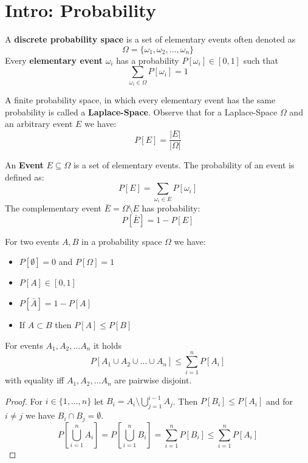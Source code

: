 \section{Intro: Probability}

\begin{definition}
    A \textbf{discrete probability space} is a set of elementary events often denoted as 
    $$\Omega = \{ \omega_1, \omega_2, \dots, \omega_n \}$$
    Every \textbf{elementary event} $\omega_i$ has a probability $P[\omega_i] \in [0,1]$ such that
    $$\sum_{\omega_i \in \Omega} P[\omega_i] = 1$$
\end{definition}

\begin{remark}
    A finite probability space, in which every elementary event has the same probability is called a
    \textbf{Laplace-Space}. Observe that for a Laplace-Space $\Omega$ and an arbitrary event $E$ we have:
    $$P[E] = \frac{\vert E \vert}{\vert \Omega \vert}$$
\end{remark}

\begin{definition}
    An \textbf{Event} $E \subseteq \Omega$ is a set of elementary events. The probability of an event is defined as:
    $$P[E] = \sum_{\omega_i \in E} P[\omega_i]$$
    The complementary event $\bar{E} = \Omega \setminus E$ has probability:
    $$P[\bar{E}] = 1 - P[E]$$
\end{definition}

\begin{theorem}
    For two events $A, B$ in a probability space $\Omega$ we have:
    \begin{itemize}
        \item $P[\emptyset] = 0$ and $P[\Omega] = 1$
        \item $P[A] \in [0,1]$
        \item $P[\bar{A}] = 1 - P[A]$
        \item If $A \subset B$ then $P[A] \le P[B]$
    \end{itemize}
\end{theorem}

\begin{theorem}
    For events $A_1, A_2, ... A_n$ it holds
    $$P[A_1 \cup A_2 \cup \dots \cup A_n] \leq \sum_{i=1}^n P[A_i]$$
    with equality iff $A_1, A_2, ... A_n$ are pairwise disjoint.
\end{theorem}

\begin{proof}
    For $i \in \{1, \dots, n\}$ let $B_i = A_i \setminus \bigcup_{j=1}^{i-1} A_j$. Then $P[B_i] \leq P[A_i]$ and for $i \neq j$ we have $B_i \cap B_j = \emptyset$.
    $$P[\bigcup_{i=1}^n A_i] = P[\bigcup_{i=1}^n B_i] = \sum_{i=1}^n P[B_i] \leq \sum_{i=1}^n P[A_i]$$
\end{proof}

